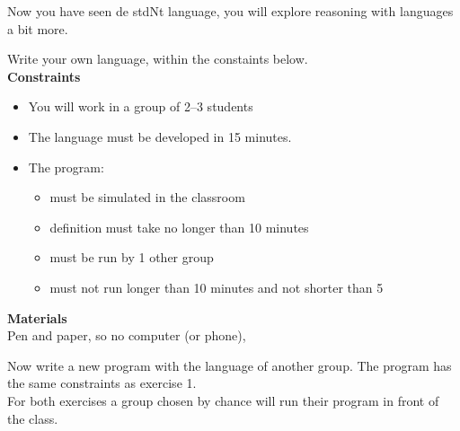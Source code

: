 \documentclass[11pt, a4paper]{article}
\begin{document}
\setcounter{opgave}{1}
Now you have seen de stdNt language, you will explore reasoning with languages a bit more.

Write your own language, within the constaints below. 
\\

\textbf{Constraints}\\
\begin{itemize}
    \item You will work in a group of 2--3 students
    \item The language must be developed in 15 minutes. 
    \item The program:
    
    \begin{itemize}
        \item must be simulated in the classroom
        \item definition must take no longer than 10 minutes
        \item must be run by 1 other group
        \item must not run longer than 10 minutes and not shorter than 5
    \end{itemize}
\end{itemize}

\textbf{Materials}\\
Pen and paper, so no computer (or phone), 

Now write a new program with the language of another group. The program has the same constraints as exercise 1.\\

For both exercises a group chosen by chance will run their program in front of the class.
\einde
\end{document}
